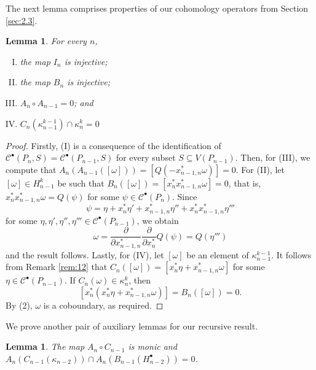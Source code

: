 \documentclass[12pt]{amsart}
\newtheorem{lem}[theorem]{Lemma}
\theoremstyle{definition}
\begin{document}
The next lemma comprises properties of our cohomology operators from Section \ref{sec:2.3}.

\begin{lem}\label{lem:merge}
For every $n$,

\begin{enumerate}[(I)]
    \item the map $I_n$ is injective;
    \item the map $B_n$ is injective;
    \item $A_n\circ A_{n-1}=0$; and
    \item $C_n(\kappa_{n-1}^{k-1})\cap \kappa_n^k = 0$
\end{enumerate}

\end{lem}

\begin{proof}
Firstly, (I) is a consequence of the identification of $\mathcal C^\bullet(P_n,S)=\mathcal C^\bullet(P_{n-1},S)$ for every subset $S\subseteq V(P_{n-1})$. Then, for (III), we compute that $A_n(A_{n-1}([\omega]))=[Q(-x_{n-1,n}^*\omega)]=0$. For (II), let $[\omega]\in H^k_{n-1}$ be such that $B_n([\omega])=[x_n^*x_{n-1,n}^*\omega]=0$, that is, $x_n^*x_{n-1,n}^*\omega=Q(\psi)$ for some $\psi\in \mathcal C^\bullet(P_n)$. Since 
\[\psi = \eta+x_n^*\eta'+x_{n-1,n}^*\eta''+x_n^*x_{n-1,n}^*\eta'''\]
for some $\eta,\eta',\eta'',\eta'''\in \mathcal C^\bullet(P_{n-1})$, we obtain
\[
\omega=\frac{\partial}{\partial x_{n-1,n}^*}\frac{\partial}{\partial x_n^*} Q(\psi) = Q(\eta''')
\]
and the result follows. Lastly, for (IV), let $[\omega]$ be an element of $\kappa_{n-1}^{k-1}$. It follows from Remark \ref{rem:12} that $C_n([\omega])=[x_n^*\eta+x_{n-1,n}^*\omega]$ for some $\eta\in \mathcal C^\bullet(P_{n-1})$. If $C_n(\omega)\in \kappa_n^k$, then 
\begin{equation}\label{eq:20}
[x_n^*(x_n^*\eta+x_{n-1,n}^*\omega)]=B_n([\omega])=0.
\end{equation}
By (2), $\omega$ is a coboundary, as required.
\end{proof}

We prove another pair of auxiliary lemmas for our recursive result.

\begin{lem}\label{lem:12}
The map $A_n\circ C_{n-1}$ is monic and $A_n(C_{n-1}(\kappa_{n-2}))\cap A_n(B_{n-1}(H_{n-2}^\bullet))=0$. 
\end{lem}
\end{document}
